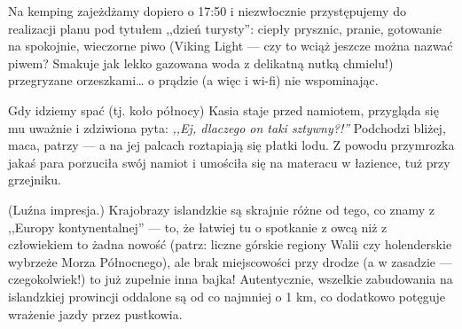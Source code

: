 
Na kemping zajeżdżamy dopiero o 17:50 i niezwłocznie przystępujemy do realizacji planu pod tytułem ,,dzień turysty'': ciepły prysznic, pranie, gotowanie na spokojnie, wieczorne piwo (Viking Light --- czy to wciąż jeszcze można nazwać piwem? Smakuje jak lekko gazowana woda z delikatną nutką chmielu!) przegryzane orzeszkami… o prądzie (a więc i wi-fi) nie wspominając.

Gdy idziemy spać (tj. koło północy) Kasia staje przed namiotem, przygląda się mu uważnie i zdziwiona pyta: \emph{,,Ej, dlaczego on taki sztywny?!''} Podchodzi bliżej, maca, patrzy --- a na jej palcach roztapiają się płatki lodu. Z powodu przymrozka jakaś para porzuciła swój namiot i umościła się na materacu  w łazience, tuż przy grzejniku.


(Luźna impresja.) Krajobrazy islandzkie są skrajnie różne od tego, co znamy z ,,Europy kontynentalnej'' --- to, że łatwiej tu o spotkanie z owcą niż z człowiekiem to żadna nowość (patrz: liczne górskie regiony Walii czy holenderskie wybrzeże Morza Północnego), ale brak miejscowości przy drodze (a w zasadzie --- czegokolwiek!) to już zupełnie inna bajka! Autentycznie, wszelkie zabudowania na islandzkiej prowincji oddalone są od  co najmniej o 1 km, co dodatkowo potęguje wrażenie jazdy przez pustkowia.


